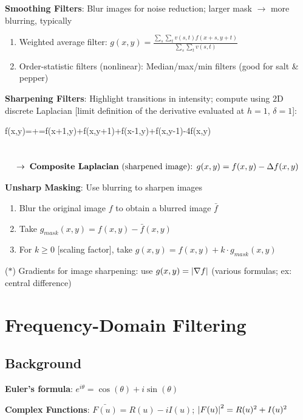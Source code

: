 \documentclass[12pt]{extarticle}
\begin{document}
\newp
\textbf{Smoothing Filters}: Blur images for noise reduction; larger mask $\to$ more blurring, typically \begin{enumerate}
    \item Weighted average filter: $g(x,y)=\frac{\sum_{s}\sum_{t}v(s,t)f(x+s,y+t)}{\sum_{s}\sum_{t}v(s,t)}$
    \item Order-statistic filters (nonlinear): Median/max/min filters (good for salt \& pepper)
\end{enumerate}

\newp
\textbf{Sharpening Filters}: Highlight transitions in intensity; compute using 2D discrete Laplacian [limit definition of the derivative evaluated at $h=1$, $\delta=1$]: \begin{eqnbox}
    \Delta f(x,y)=+=f(x+1,y)+f(x,y+1)+f(x-1,y)+f(x,y-1)-4f(x,y)
\end{eqnbox} \\[-32pt]
\begin{gather*}
    \to\;\text{\textbf{Composite Laplacian} (sharpened image): } g(x,y)=f(x,y)-\Delta f(x,y)
\end{gather*}

\newp
\textbf{Unsharp Masking}: Use blurring to sharpen images \begin{enumerate}
    \item Blur the original image $f$ to obtain a blurred image $\bar{f}$
    \item Take $g_{mask}(x,y)=f(x,y)-\bar{f}(x,y)$
    \item For $k\geq0$ [scaling factor], take $g(x,y)=f(x,y)+k\cdot g_{mask}(x,y)$
\end{enumerate}

\newp
($\ast$) Gradients for image sharpening: use $g(x,y)=\left|\nabla f\right|$ (various formulas; ex: central difference)


\section{Frequency-Domain Filtering}
\subsection{Background}
\textbf{Euler's formula}: $e^{i\theta}=\cos(\theta)+i\sin(\theta)$

\newp
\textbf{Complex Functions}: $\bar{F(u)}=R(u)-iI(u)$; $\left|F(u)\right|^2=R(u)^2+I(u)^2$
\end{document}
